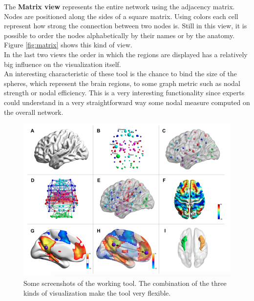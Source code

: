 \documentclass{article}
\begin{document}
\begin{multicols}{2}

The \textbf{Matrix view} represents the entire network using the adjacency matrix. Nodes are positioned along the sides of a square matrix. Using colors each cell represent how strong the connection between two nodes is. Still in this view, it is possible to order the nodes alphabetically by their names or by the anatomy. Figure \ref{fig:matrix} shows this kind of view.\\


In the last two views the order in which the regions are displayed has a relatively big influence on the visualization itself. \\
An interesting characteristic of these tool is the chance to bind the size of the spheres, which represent the brain regions, to some graph metric such as nodal strength or nodal efficiency. This is a very interesting functionality since experts could understand in a very straightforward way some nodal measure computed on the overall network.\\

%
%
\begin{figure}[ht]
\centerline{\includegraphics[width=1.9\columnwidth]{brain2}}
\caption{Some screenshots of the working tool. The combination of the three kinds of visualization make the tool very flexible.}
    \label{fig:brain2}
\end{figure}


\end{multicols}
\end{document}
